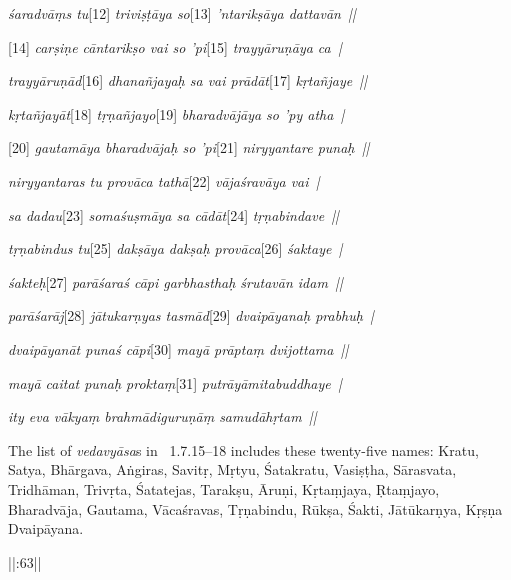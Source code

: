 {{  \textit{śaradvāṃs tu}[12]\textit{ triviṣṭāya so}[13]\textit{ 'ntarikṣāya dattavān~||} 
 
  [14]\textit{ carṣiṇe cāntarikṣo vai so 'pi}[15]\textit{ trayyāruṇāya ca~|} 
 
  \textit{trayyāruṇād}[16]\textit{ dhanañjayaḥ sa vai prādāt}[17]\textit{ kṛtañjaye~||} 
 
  \textit{kṛtañjayāt}[18]\textit{ tṛṇañjayo}[19]\textit{ bharadvājāya so 'py atha~|} 
 
  [20]\textit{ gautamāya bharadvājaḥ so 'pi}[21]\textit{ niryyantare punaḥ~||} 
 
  \textit{niryyantaras tu provāca tathā}[22]\textit{ vājaśravāya vai~|} 
 
  \textit{sa dadau}[23]\textit{ somaśuṣmāya sa cādāt}[24]\textit{ tṛṇabindave~||} 
 
  \textit{tṛṇabindus tu}[25]\textit{ dakṣāya dakṣaḥ provāca}[26]\textit{ śaktaye~|} 
 
  \textit{śakteḥ}[27]\textit{ parāśaraś cāpi garbhasthaḥ śrutavān idam~||} 
 
  \textit{parāśarāj}[28]\textit{ jātukarṇyas tasmād}[29]\textit{ dvaipāyanaḥ prabhuḥ~|} 
 
  \textit{dvaipāyanāt punaś cāpi}[30]\textit{ mayā prāptaṃ dvijottama~||} 
 
  \textit{mayā caitat punaḥ proktaṃ}[31]\textit{ putrāyāmitabuddhaye~|} 
 
  \textit{ity eva vākyaṃ brahmādiguruṇāṃ samudāhṛtam~||} 
 
  
 
  The list of \textit{vedavyāsa}s in \LinPu\ 1.7.15--18 includes these twenty-five names:
  Kratu, Satya, Bhārgava, Aṅgiras, Savitṛ,
  Mṛtyu, Śatakratu, Vasiṣṭha, Sārasvata, Tridhāman,
  Trivṛta, Śatatejas, Tarakṣu, Āruṇi, Kṛtaṃjaya,
  Ṛtaṃjayo, Bharadvāja, Gautama, Vācaśravas, Tṛṇabindu,
  Rūkṣa, Śakti, Jātūkarṇya, Kṛṣṇa Dvaipāyana.
}}


  ||:63\thinspace||%

